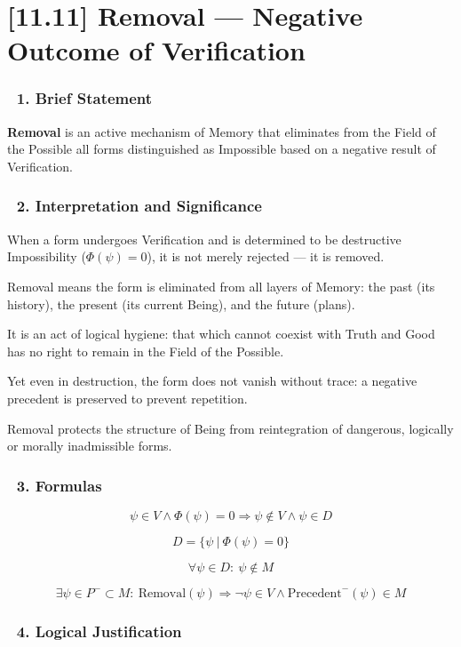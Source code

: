 \documentclass[12pt]{article}
\begin{document}
\section*{[11.11] Removal — Negative Outcome of Verification}

\subsubsection*{🔹 1. Brief Statement}

\textbf{Removal} is an active mechanism of Memory that eliminates from the Field of the Possible all forms distinguished as Impossible based on a negative result of Verification.

\subsubsection*{🔹 2. Interpretation and Significance}

When a form undergoes Verification and is determined to be destructive Impossibility ($\Phi(\psi) = 0$), it is not merely rejected — it is removed.

Removal means the form is eliminated from all layers of Memory: the past (its history), the present (its current Being), and the future (plans).

It is an act of logical hygiene: that which cannot coexist with Truth and Good has no right to remain in the Field of the Possible.

Yet even in destruction, the form does not vanish without trace: a negative precedent is preserved to prevent repetition.

Removal protects the structure of Being from reintegration of dangerous, logically or morally inadmissible forms.

\subsubsection*{🔹 3. Formulas}

\[
\psi \in V \land \Phi(\psi) = 0 \Rightarrow \psi \notin V \land \psi \in D
\]

\[
D = \{\psi\ |\ \Phi(\psi) = 0\}
\]

\[
\forall \psi \in D:\ \psi \notin M
\]

\[
\exists \psi \in P^- \subset M:\ \text{Removal}(\psi) \Rightarrow \neg\psi \in V \land \text{Precedent}^-(\psi) \in M
\]

\subsubsection*{🔹 4. Logical Justification}
\end{document}
